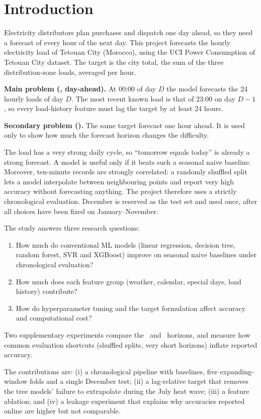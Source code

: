 \section{Introduction}\label{sec:introduction}
Electricity distributors plan purchases and dispatch one day ahead, so they need a forecast of every hour of the next day. This project forecasts the hourly electricity load of Tetouan City (Morocco), using the UCI Power Consumption of Tetouan City dataset\cite{uci}. The target is the city total, the sum of the three distribution-zone loads, averaged per hour.

\textbf{Main problem (\hday, day-ahead).} At 00:00 of day $D$ the model forecasts the 24 hourly loads of day $D$. The most recent known load is that of 23:00 on day $D-1$, so every load-history feature must lag the target by at least 24 hours.

\textbf{Secondary problem (\hone).} The same target forecast one hour ahead. It is used only to show how much the forecast horizon changes the difficulty.

The load has a very strong daily cycle, so ``tomorrow equals today'' is already a strong forecast. A model is useful only if it beats such a seasonal naive baseline. Moreover, ten-minute records are strongly correlated: a randomly shuffled split lets a model interpolate between neighbouring points and report very high accuracy without forecasting anything. The project therefore uses a strictly chronological evaluation. December is reserved as the test set and used once, after all choices have been fixed on January--November.

The study answers three research questions:
\begin{enumerate}
\item[\textbf{RQ1}] How much do conventional ML models (linear regression, decision tree, random forest, SVR and XGBoost) improve on seasonal naive baselines under chronological evaluation?
\item[\textbf{RQ2}] How much does each feature group (weather, calendar, special days, load history) contribute?
\item[\textbf{RQ3}] How do hyperparameter tuning and the target formulation affect accuracy and computational cost?
\end{enumerate}
Two supplementary experiments compare the \hday\ and \hone\ horizons, and measure how common evaluation shortcuts (shuffled splits, very short horizons) inflate reported accuracy.

The contributions are: (i) a chronological pipeline with baselines, five expanding-window folds and a single December test; (ii) a lag-relative target that removes the tree models' failure to extrapolate during the July heat wave; (iii) a feature ablation; and (iv) a leakage experiment that explains why accuracies reported online are higher but not comparable.
